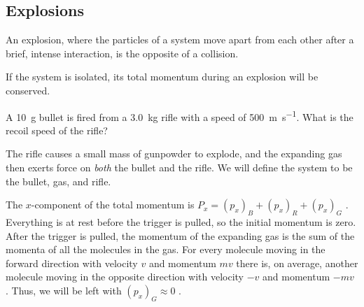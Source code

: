 \subsection{Explosions}

\begin{definition}[Explosion]
    An explosion, where the particles of a system move apart from each
    other after a brief, intense interaction, is the opposite of a
    collision.
\end{definition}

If the system is isolated, its total momentum during an explosion will
be conserved.

\begin{Exercise}[title={Recoil}, origin={Knight}]
    A \SI{10}{\gram} bullet is fired from a \SI{3.0}{\kilogram} rifle
    with a speed of \SI{500}{\metre\per\second}.  What is the recoil
    speed of the rifle?
\end{Exercise}

\begin{Answer}
    The rifle causes a small mass of gunpowder to explode, and the
    expanding gas then exerts force on \emph{both} the bullet and the
    rifle.  We will define the system to be the bullet, gas, and rifle.

    The
    $
        x
    $-component of the total momentum is
    $
        P_x=(p_x)_B + (p_x)_R + (p_x)_G
    $%
.    Everything is at rest before the trigger is pulled, so the initial
    momentum is zero.  After the trigger is pulled, the momentum of the
    expanding gas is the sum of the momenta of all the molecules in the
    gas.  For every molecule moving in the forward direction with
    velocity
    $
        v
    $ and momentum
    $
        mv
    $ there is, on average, another molecule moving in the opposite
    direction with velocity
    $
        -v
    $ and momentum
    $
        -mv
    $%
.    Thus, we will be left with
    $
        (p_x)_G \approx 0
    $%
    .
\end{Answer}
